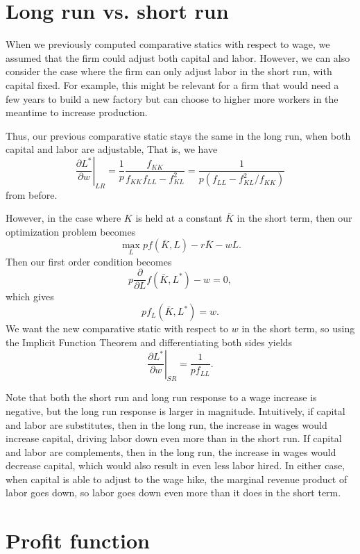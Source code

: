 \section{Long run vs. short run}


When we previously computed comparative statics with respect to wage, we assumed that the firm could adjust both capital and labor. However, we can also consider the case where the firm can only adjust labor in the short run, with capital fixed. For example, this might be relevant for a firm that would need a few years to build a new factory but can choose to higher more workers in the meantime to increase production.

Thus, our previous comparative static stays the same in the long run, when both capital and labor are adjustable, That is, we have 
$$\left.\frac{\partial L^{*}}{\partial w}\right|_{L R}=\frac{1}{p} \frac{f_{K K}}{f_{K K} f_{L L}-f_{K L}^{2}}=\frac{1}{p\left(f_{L L}-f_{K L}^{2} / f_{K K}\right)}$$
from before.

However, in the case where $K$ is held at a constant $\bar{K}$ in the short term, then our optimization problem becomes
$$\max_L pf(\bar{K}, L) - r\bar{K} - wL.$$
Then our first order condition becomes
$$p\frac{\partial}{\partial L} f(\bar{K}, L^*) - w = 0,$$
which gives
$$pf_L(\bar{K}, L^*) = w.$$
We want the new comparative static with respect to $w$ in the short term, so using the Implicit Function Theorem and differentiating both sides yields
$$\left.\frac{\partial L^{*}}{\partial w}\right|_{S R}=\frac{1}{p f_{L L}}.$$

Note that both the short run and long run response to a wage increase is negative, but the long run response is larger in magnitude. Intuitively, if capital and labor are substitutes, then in the long run, the increase in wages would increase capital, driving labor down even more than in the short run. If capital and labor are complements, then in the long run, the increase in wages would decrease capital, which would also result in even less labor hired. In either case, when capital is able to adjust to the wage hike, the marginal revenue product of labor goes down, so labor goes down even more than it does in the short term.

\section{Profit function}

